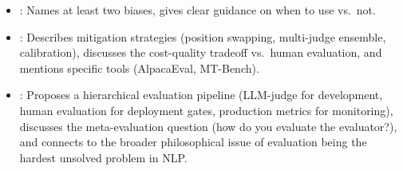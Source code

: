 \begin{interviewq}

\goodgreat
\begin{itemize}
    \item {}: Names at least two biases, gives clear guidance on
          when to use vs.\ not.
    \item {}: Describes mitigation strategies (position swapping,
          multi-judge ensemble, calibration), discusses the cost-quality tradeoff
          vs.\ human evaluation, and mentions specific tools (AlpacaEval,
          MT-Bench).
    \item {}: Proposes a hierarchical evaluation pipeline
          (LLM-judge for development, human evaluation for deployment gates,
          production metrics for monitoring), discusses the meta-evaluation
          question (how do you evaluate the evaluator?), and connects to the
          broader philosophical issue of evaluation being the hardest unsolved
          problem in NLP.
\end{itemize}

\end{interviewq}

\vspace{0.5em}

